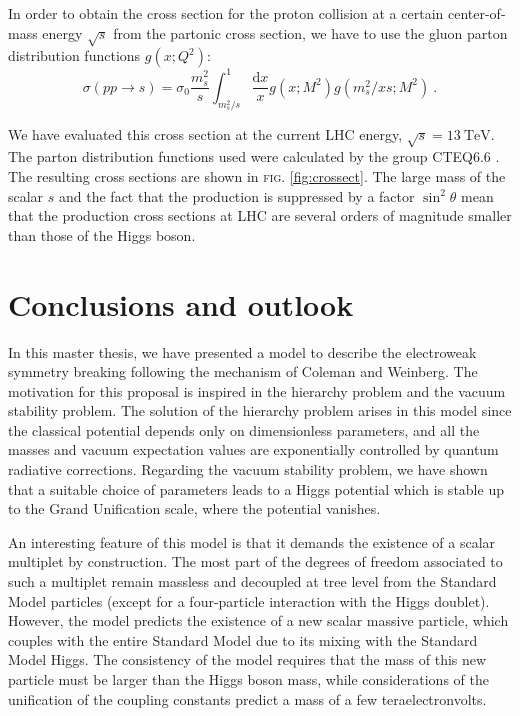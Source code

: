 \documentclass[aps,prd,preprintnumbers,nofootinbibn,twocolumn]{revtex4}
\newcommand{\dif}{\mathrm{d}}
\begin{document}
In order to obtain the cross section for the proton collision at a certain center-of-mass energy $\sqrt{s}$ from the partonic cross section, we have to use the gluon parton distribution functions $g(x; Q^2)$:
\begin{equation}
\sigma(pp\to s) = \sigma_0 \frac{m_s^2}{s} \int_{m_s^2/s}^1\frac{\dif x}{x} g(x; M^2) g(m_s^2/xs; M^2) \ .
\end{equation}



We have evaluated this cross section at the current LHC energy, $\sqrt{s}=\SI{13}{\tera\electronvolt}$. The parton distribution functions used were calculated by the group \textsc{CTEQ6.6} \cite{Nadolsky:2008zw}. The resulting cross sections are shown in \textsc{fig.} \ref{fig:crossect}. The large mass of the scalar $s$ and the fact that the production is suppressed by a factor $\sin^2\theta$ mean that the production cross sections at LHC are several orders of magnitude smaller than those of the Higgs boson.


\section{Conclusions and outlook}\label{sect:conclusion}
In this master thesis, we have presented a model to describe the electroweak symmetry breaking following the mechanism of Coleman and Weinberg. The motivation for this proposal is inspired in the hierarchy problem and the vacuum stability problem. The solution of the hierarchy problem arises in this model since the classical potential depends only on dimensionless parameters, and all the masses and vacuum expectation values are exponentially controlled by quantum radiative corrections. Regarding the vacuum stability problem, we have shown that a suitable choice of parameters leads to a Higgs potential which is stable up to the Grand Unification scale, where the potential vanishes. 

An interesting feature of this model is that it demands the existence of a scalar multiplet by construction. The most part of the degrees of freedom associated to such a multiplet remain massless and decoupled at tree level from the Standard Model particles (except for a four-particle interaction with the Higgs doublet). However, the model predicts the existence of a new scalar massive particle, which couples with the entire Standard Model due to its mixing with the Standard Model Higgs. The consistency of the model requires that the mass of this new particle must be larger than the Higgs boson mass, while considerations of the unification of the coupling constants predict a mass of a few teraelectronvolts.
\end{document}
